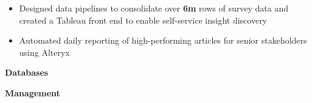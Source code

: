 \begin{paracol}{2}
		\divider

		\begin{itemize}
			\item Designed data pipelines to consolidate over \textbf{6m} rows of survey data and created
				a Tableau front end to enable self-service insight discovery

			\item Automated daily reporting of high-performing articles for senior stakeholders using Alteryx

			\medskip

			   
		\end{itemize}

		\switchcolumn


    \makecvinfo



		\divider

		\textbf{\faDatabase \:Databases}

		\medskip

		  

		\smallskip

		 

		\divider

		\textbf{\faGithub \:Management}

		\medskip

		  

		\smallskip


		\divider


\end{paracol}

